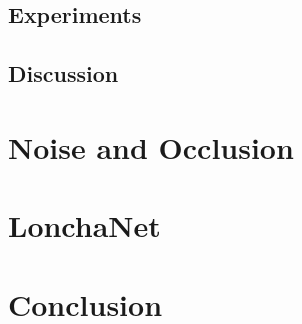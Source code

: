 \subsection{Experiments}
\label{cha:objrecog:sec:pointnet:subsec:experiments}

\subsection{Discussion}
\label{cha:objrecog:sec:pointnet:subsec:discussion}

\section{Noise and Occlusion}
\label{cha:objrecog:sec:study}

\section{LonchaNet}
\label{cha:objrecog:sec:lonchanet}

\section{Conclusion}
\label{cha:objrecog:sec:conclusion}
